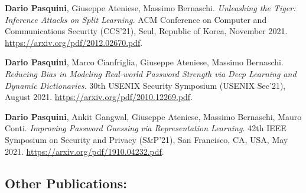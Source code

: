 \documentclass[margin, 10pt]{article} %
\begin{document}
\begin{thebibliography}{99}
\textbf{Dario Pasquini}, Giuseppe Ateniese, Massimo Bernaschi. \textit{Unleashing the Tiger: Inference Attacks on Split Learning.} ACM Conference on Computer and Communications Security (CCS'21),  Seul, Republic of Korea, November 2021. \url{https://arxiv.org/pdf/2012.02670.pdf}. 

\textbf{Dario Pasquini}, Marco Cianfriglia, Giuseppe Ateniese, Massimo Bernaschi. \textit{Reducing Bias in Modeling Real-world Password Strength via Deep Learning and Dynamic Dictionaries.} 30th USENIX Security Symposium (USENIX Sec'21), August 2021. \url{https://arxiv.org/pdf/2010.12269.pdf}. 
	
 \textbf{Dario Pasquini}, Ankit Gangwal, Giuseppe Ateniese, Massimo Bernaschi, Mauro Conti. \textit{Improving Password Guessing via Representation Learning.}  42th IEEE Symposium on Security and Privacy (S\&P'21), San Francisco, CA, USA, May 2021. \url{https://arxiv.org/pdf/1910.04232.pdf}. 

\end{thebibliography}




	
\subsection*{Other Publications:}
\vspace{.5cm}
\end{document}
